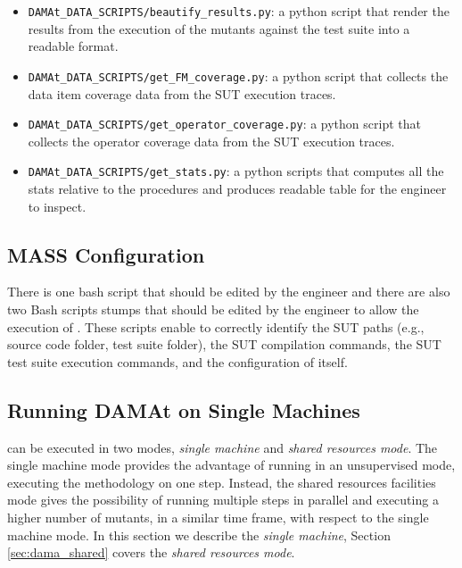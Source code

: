 \begin{itemize}
\begin{itemize}
    \item \texttt{DAMAt\_DATA\_SCRIPTS/beautify\_results.py}: a python script that render the results from the execution of the mutants against the test suite into a readable format.
    \item \texttt{DAMAt\_DATA\_SCRIPTS/get\_FM\_coverage.py}: a python script that collects the data item coverage data from the SUT execution traces.
    \item \texttt{DAMAt\_DATA\_SCRIPTS/get\_operator\_coverage.py}: a python script that collects the operator coverage data from the SUT execution traces.
    \item \texttt{DAMAt\_DATA\_SCRIPTS/get\_stats.py}: a python scripts that computes all the stats relative to the \DAMA procedures and produces readable table for the engineer to inspect.

	\end{itemize}

\end{itemize}

\subsection{MASS Configuration}
There is one bash script that should be edited by the engineer and there are also two Bash scripts stumps that should be edited by the engineer to allow the execution of \DAMA. These scripts enable \DAMA to correctly identify the SUT paths (e.g., source code folder, test suite folder), the SUT compilation commands, the SUT test suite execution commands, and the configuration of \DAMA itself.

\subsection{Running DAMAt on Single Machines}
\label{sec:dama_singlelaunch}


\DAMA can be executed in two modes, \emph{single machine} and \emph{shared resources mode}. The single machine mode provides the advantage of running \DAMA in an unsupervised mode, executing the methodology on one step. Instead, the shared resources facilities mode gives the possibility of running multiple steps in parallel and executing a higher number of mutants, in a similar time frame, with respect to the single machine mode. In this section we describe the \emph{single machine}, Section \ref{sec:dama_shared} covers the \emph{shared resources mode}.


